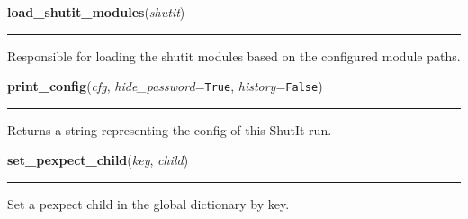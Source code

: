     \label{util:load_shutit_modules}

    \vspace{0.5ex}

\hspace{.8\funcindent}\begin{boxedminipage}{\funcwidth}

    \raggedright \textbf{load\_shutit\_modules}(\textit{shutit})

    \vspace{-1.5ex}

    \rule{\textwidth}{0.5\fboxrule}
\setlength{\parskip}{2ex}
    Responsible for loading the shutit modules based on the configured 
    module paths.

\setlength{\parskip}{1ex}
    \end{boxedminipage}

    \label{util:print_config}

    \vspace{0.5ex}

\hspace{.8\funcindent}\begin{boxedminipage}{\funcwidth}

    \raggedright \textbf{print\_config}(\textit{cfg}, \textit{hide\_password}={\tt True}, \textit{history}={\tt False})

    \vspace{-1.5ex}

    \rule{\textwidth}{0.5\fboxrule}
\setlength{\parskip}{2ex}
    Returns a string representing the config of this ShutIt run.

\setlength{\parskip}{1ex}
    \end{boxedminipage}

    \label{util:set_pexpect_child}

    \vspace{0.5ex}

\hspace{.8\funcindent}\begin{boxedminipage}{\funcwidth}

    \raggedright \textbf{set\_pexpect\_child}(\textit{key}, \textit{child})

    \vspace{-1.5ex}

    \rule{\textwidth}{0.5\fboxrule}
\setlength{\parskip}{2ex}
    Set a pexpect child in the global dictionary by key.

\setlength{\parskip}{1ex}
    \end{boxedminipage}


